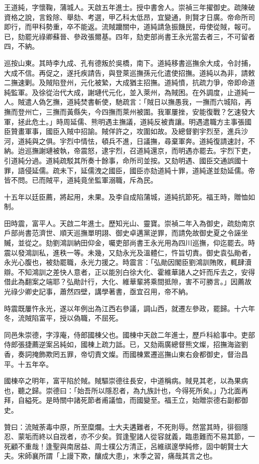 \begin{pinyinscope}
王道純，字懷鞠，蒲城人。天啟五年進士。授中書舍人。崇禎三年擢御史。疏陳破資格之說，言銓除、舉劾、考選，甲乙科太低昂，宜變通，則賢才日廣。帝命所司即行，而甲科勢重，卒不能返。流賊躪關中，道純請急振饑民，毋使從賊，報可。已，劾罷光祿卿蘇晉、參政張爾基。四年，劾吏部尚書王永光當去者三，不可留者四，不納。

巡按山東。其時李九成、孔有德叛於吳橋，南下。道純移書巡撫余大成，令討捕，大成不信。再促之，遂托疾請告，與登萊巡撫孫元化遣使招撫。道純以為非，請敕二撫速剿。及賊陷登州，元化被縶，大成猶主招撫。道純憤，抗疏力爭，帝即命道純監軍。及徐從治代大成，謝璉代元化，並入萊州，為賊困。在外調度，止道純一人。賊遣人偽乞撫，道純焚書斬使，馳疏言：「賊日以撫愚我，一撫而六城陷，再撫而登州亡，三撫而黃縣失，今四撫而萊州被圍。我軍屢挫，安能復戰？乞速發大軍，拯此危土。」時周延儒、熊明遇主撫議，道純反被責讓。明遇遣職方主事張國臣贊畫軍事，國臣入賊中招諭。賊佯許之，攻圍如故。及總督劉宇烈至，進兵沙河，道純與之俱。宇烈中情怯，頓兵不進，日議撫，尋棄軍奔。道純復請速討，不納。迨巡撫謝璉被執，帝震怒，逮宇烈，召道純還京，而明遇亦罷去。宇烈下吏，引道純分過。道純疏駁其所奏十餘事，命所司並按。又劾明遇、國臣交通誤國十罪，語侵延儒。疏未下，延儒洩之國臣，國臣亦劾道純十罪，道純遂並劾延儒。帝皆不問。已而賊平，道純竟坐監軍溺職，斥為民。

十五年以廷臣薦，將起用，未果。及李自成陷蒲城，道純抗節死。福王時，贈恤如制。

田時震，富平人。天啟二年進士。歷知光山、靈寶。崇禎二年入為御史，疏劾南京戶部尚書范濟世、順天巡撫單明詡、御史卓邁黨逆罪，而請免故御史夏之令誣坐贓，並從之。劾劉鴻訓納田仰金，囑吏部尚書王永光用為四川巡撫，仰迄罷去。時震以發鴻訓私，進秩一等。未幾，又劾永光及溫體仁，忤旨切責。御史袁弘勛者，永光心腹也，被劾罷職，永光力援之。時震言：「弘勛因閣臣劉鴻訓賄敗，輒肆瀆辯。不知鴻訓之差快人意者，正以能別白徐大化、霍維華諸人之奸而斥去之，安得借此為翻案之端耶？弘勛計行，大化、維華輩將乘間抵隙，害不可勝言。」因薦故光祿少卿史記事，蕭然四壁，講學著書，亟宜召用，帝不納。

時震既屢忤永光，遂以年例出為江西右參議，調山西，就遷左參政，罷歸。十六年冬，流賊陷富平，授以偽職，不屈死。

同邑朱崇德，字淳庵，侍郎國棟父也。國棟中天啟二年進士，歷戶科給事中。吏部侍郎張捷薦逆案呂純如，國棟上疏力詆。已，又劾兩廣總督熊文燦，招撫海盜劉香，奏詞掩飾欺罔五罪，帝切責文燦。而國棟累遷巡撫山東右僉都御史，督治昌平。十五年卒。

國棟卒之明年，富平陷於賊。賊驅崇德往長安，中道稱病。賊見其老，以為果病也，聽之歸。崇德曰：「始吾所以隱忍者，為九族計也，今得死所矣。」乃北面再拜，自縊死。是時關中諸死節者甫議恤，而國變至。福王立，始贈崇德右副都御史。

贊曰：流賊荼毒中原，所至糜爛。士大夫遘難者，不死則辱。然當其時，徘徊隱忍、蒙垢而終以自戕者，亦不少矣。賀逢聖諸人從容就義，臨患難而不易其節，一死顧不重哉！逢聖與南居益、周士樸公方清正，呂維祺邃學純修，固中朝賢士大夫。宋師襄所謂「上謾下欺，釀成大患」，末季之習，痛哉其言之也。


\end{pinyinscope}